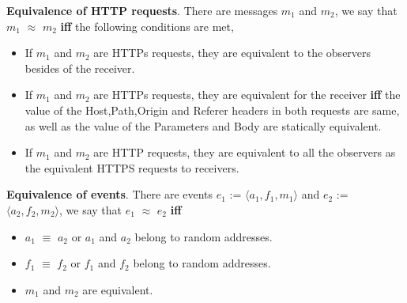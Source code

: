 {\begin{definition}
\vspace{1mm}\noindent\textbf{Equivalence of HTTP requests}. There are messages $m_1$ and $m_2$, we say that $m_1$ $\approx$ $m_2$ \textbf{iff} the following conditions are met,
\begin{itemize}
\item If $m_1$ and $m_2$ are HTTPs requests, they are  equivalent to the observers besides of the receiver.
\item If  $m_1$ and $m_2$ are HTTPs requests, they are equivalent for the receiver \textbf{iff} the value of the Host,Path,Origin and Referer headers in both requests are same, as well as the value of the Parameters and Body are statically equivalent.
\item If  $m_1$ and $m_2$ are HTTP requests, they are equivalent to all the observers as the equivalent HTTPS requests to receivers.
\end{itemize}
\label{def:httpequ}
\end{definition}

\begin{definition}
\vspace{1mm}\noindent\textbf{Equivalence of events}. 
There are events $e_1$ := $\langle a_1, f_1, m_1 \rangle$ and $e_2$ := $\langle a_2, f_2, m_2 \rangle$, we say that $e_1$ $\approx$ $e_2$ \textbf{iff} 
\begin{itemize}
\item $a_1$ $\equiv$ $a_2$ or $a_1$ and $a_2$ belong to random addresses.
\item $f_1$ $\equiv$ $f_2$ or $f_1$ and $f_2$ belong to random addresses.
\item $m_1$ and $m_2$ are equivalent.
\end{itemize}
\label{def:eventequ}
\end{definition}

}
